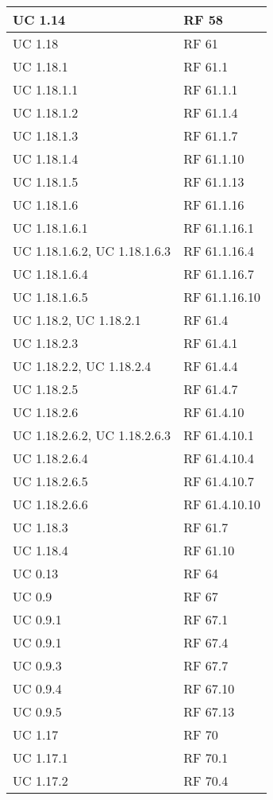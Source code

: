 {\begin{longtable} [c]{| p{4cm} | p{4cm} |}
 \hline 
UC 1.14 & RF 58\\ 
 \hline 
UC 1.18 & RF 61\\ 
 \hline 
UC 1.18.1 & RF 61.1\\ 
 \hline 
UC 1.18.1.1 & RF 61.1.1\\ 
 \hline 
UC 1.18.1.2 & RF 61.1.4\\ 
 \hline 
UC 1.18.1.3 & RF 61.1.7\\ 
 \hline 
UC 1.18.1.4 & RF 61.1.10\\ 
 \hline 
UC 1.18.1.5 & RF 61.1.13\\ 
 \hline 
UC 1.18.1.6 & RF 61.1.16\\ 
 \hline 
UC 1.18.1.6.1 & RF 61.1.16.1\\ 
 \hline 
UC 1.18.1.6.2, UC 1.18.1.6.3 & RF 61.1.16.4\\ 
 \hline 
UC 1.18.1.6.4 & RF 61.1.16.7\\ 
 \hline 
UC 1.18.1.6.5 & RF 61.1.16.10\\ 
 \hline 
UC 1.18.2, UC 1.18.2.1 & RF 61.4\\ 
 \hline 
UC 1.18.2.3 & RF 61.4.1\\ 
 \hline 
UC 1.18.2.2, UC 1.18.2.4 & RF 61.4.4\\ 
 \hline 
UC 1.18.2.5 & RF 61.4.7\\ 
 \hline 
UC 1.18.2.6 & RF 61.4.10\\ 
 \hline 
UC 1.18.2.6.2, UC 1.18.2.6.3 & RF 61.4.10.1\\ 
 \hline 
UC 1.18.2.6.4 & RF 61.4.10.4\\ 
 \hline 
UC 1.18.2.6.5 & RF 61.4.10.7\\ 
 \hline 
UC 1.18.2.6.6 & RF 61.4.10.10\\ 
 \hline 
UC 1.18.3 & RF 61.7\\ 
 \hline 
UC 1.18.4 & RF 61.10\\ 
 \hline 
UC 0.13 & RF 64\\ 
 \hline 
UC 0.9 & RF 67\\ 
 \hline 
UC 0.9.1 & RF 67.1\\ 
 \hline 
UC 0.9.1 & RF 67.4\\ 
 \hline 
UC 0.9.3 & RF 67.7\\ 
 \hline 
UC 0.9.4 & RF 67.10\\ 
 \hline 
UC 0.9.5 & RF 67.13\\ 
 \hline 
UC 1.17 & RF 70\\ 
 \hline 
UC 1.17.1 & RF 70.1\\ 
 \hline 
UC 1.17.2 & RF 70.4\\ 
 \hline 

\end{longtable}}
